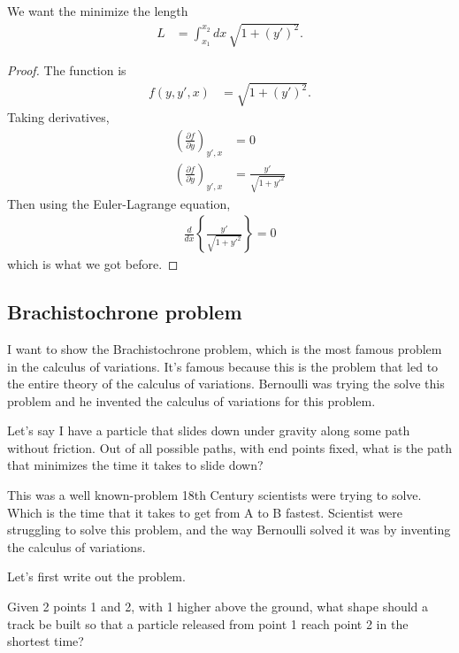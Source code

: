 \begin{example}
    We want the minimize the length
    \begin{align}
        L &= \int_{x_1}^{x_2} dx\,
        \sqrt{1 + (y')^2}.
    \end{align}
\end{example}
\begin{proof}
    The function is
    \begin{align}
        f\left( y, y', x \right) &=
        \sqrt{1 + \left( y' \right)^2}.
    \end{align}
    Taking derivatives,
    \begin{align}
        \left( \frac{\partial f}{\partial y} \right)_{y', x} &= 0\\
        \left( \frac{\partial f}{\partial y} \right)_{y', x} &=
        \frac{y'}{\sqrt{1 + y'^2}}
    \end{align}
    Then using the Euler-Lagrange equation,
    \begin{align}
        \frac{d}{dx}\left\{
            \frac{y'}{\sqrt{1 + y'^2}}
        \right\}
        = 0
    \end{align}
    which is what we got before.
\end{proof}

\subsection{Brachistochrone problem}
I want to show the Brachistochrone problem,
which is the most famous problem in the calculus of variations.
It's famous because this is the problem that led to
the entire theory of the calculus of variations.
Bernoulli was trying the solve this problem and
he invented the calculus of variations for this problem.

Let's say I have a particle that slides down under gravity along some path
without friction.
Out of all possible paths,
with end points fixed,
what is the path that minimizes the time it takes to slide down?

This was a well known-problem 18th Century scientists were trying to solve.
Which is the time that it takes to get from A to B fastest.
Scientist were struggling to solve this problem,
and the way Bernoulli solved it was by inventing the calculus of variations.

Let's first write out the problem.

Given 2 points 1 and 2,
with 1 higher above the ground,
what shape should a track be built so that a particle released from
point 1 reach point 2 in the shortest time?

